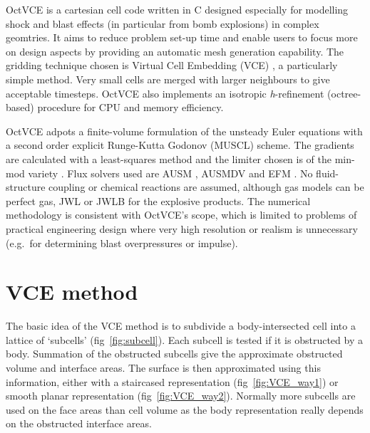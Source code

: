 \documentclass[pdftex, 12pt, a4paper]{report}
\begin{document}
OctVCE is a cartesian cell code written in C designed especially for modelling shock and blast effects (in particular from 
bomb explosions) in complex geomtries.  It aims to reduce problem set-up time and enable users to focus more on design aspects 
by providing an automatic mesh generation capability.  The gridding technique chosen is Virtual Cell 
Embedding (VCE) \cite{Landsberg:tv}, a particularly simple method.  Very small cells are merged with larger neighbours to
give acceptable timesteps.  OctVCE also implements an isotropic \emph{h}-refinement (octree-based) procedure for CPU and memory 
efficiency.     

OctVCE adpots a finite-volume formulation of the unsteady Euler equations with a second order explicit Runge-Kutta 
Godonov (MUSCL) scheme.  The gradients are calculated with a least-squares method \cite{charl:ao} and the limiter chosen is of 
the min-mod variety \cite{Barth:ou}.
Flux solvers used are AUSM \cite{Liou:an}, AUSMDV \cite{Wada:af} and EFM \cite{Pullin:ds}.  No fluid-structure coupling or chemical 
reactions are assumed, although gas models can be perfect gas, JWL \cite{Lee:ae} or JWLB \cite{Baker:io} for the explosive products.
The numerical methodology is consistent with OctVCE's scope, which is 
limited to problems of practical engineering design where very high resolution or realism is unnecessary (e.g.\ for determining
blast overpressures or impulse).

\section{VCE method}\label{sec:VCE}

The basic idea of the VCE method \cite{Landsberg:tv} is to subdivide a body-intersected cell into a lattice 
of `subcells' (fig~\ref{fig:subcell}).  Each subcell is tested if it is obstructed by a body.  
Summation of the obstructed subcells give the approximate obstructed
volume and interface areas.  The surface is then approximated using this information, either 
with a staircased representation (fig~\ref{fig:VCE_way1}) or smooth planar representation (fig~\ref{fig:VCE_way2}).
Normally more subcells are used on the face areas than cell volume as the body representation really depends on the 
obstructed interface areas.       
                                                                                                                
\end{document}
